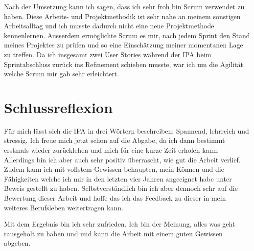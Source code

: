 Nach der Umsetzung kann ich sagen, dass ich sehr froh bin Scrum verwendet zu haben. Diese Arbeits- und Projektmethodik
ist sehr nahe an meinem sonstigen Arbeitsalltag und ich musste dadurch nicht eine neue Projektmethode kennenlernen. Ausserdem ermöglichte Scrum es mir,
nach jedem Sprint den Stand meines Projektes zu prüfen und so eine Einschätzung meiner momentanen Lage zu treffen. Da ich insgesamt zwei User Stories während der IPA beim 
Sprintabschluss zurück ins Refinement schieben musste, war ich um die Agilität welche Scrum mir gab sehr erleichtert. 

\section{Schlussreflexion}
Für mich lässt sich die IPA in drei Wörtern beschreiben: Spannend, lehrreich und stressig. 
Ich freue mich jetzt schon auf die Abgabe, da ich dann bestimmt erstmals wieder zurücklehen und mich für eine
kurze Zeit erholen kann. Allerdings bin ich aber auch sehr positiv überrascht, wie gut die Arbeit verlief. Zudem kann ich mit vollstem
Gewissen behaupten, mein Können und die Fähigkeiten welche ich mir in den letzten vier Jahren angeeignet habe unter Beweis gestellt zu haben. 
Selbstverständlich bin ich aber dennoch sehr auf die Bewertung dieser Arbeit und hoffe das ich das Feedback zu dieser in mein weiteres Berufsleben weitertragen
kann.

Mit dem Ergebnis bin ich sehr zufrieden. Ich bin der Meinung, alles was geht rausgeholt zu haben und
und kann die Arbeit mit einem guten Gewissen abgeben.